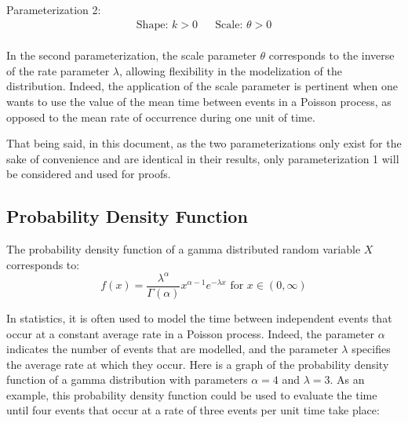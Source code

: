 \documentclass[12pt]{article}
\begin{document}
\noindent Parameterization 2:\vspace*{-24pt}
\begin{align*}
	\text{Shape: } k>0			&&	\text{Scale: }\theta>0
\end{align*}\\[-60pt]

In the second parameterization, the scale parameter $\theta$ corresponds to the inverse of the rate parameter $\lambda$,
allowing flexibility in the modelization of the distribution. Indeed, the application of the scale parameter is
pertinent when one wants to use the value of the mean time between events in a Poisson process, as
opposed to the mean rate of occurrence during one unit of time.

That being said, in this document, as the two parameterizations only exist for the sake of convenience and are identical
in their results, only parameterization 1 will be considered and used for proofs.


\pagebreak
\subsection{Probability Density Function}\label{subsec:gamma:pdf}
The probability density function of a gamma distributed random variable $X$ corresponds to:
\begin{equation}\label{eq:gamma:pdf}
	f(x) = \frac{\lambda^\alpha}{\Gamma(\alpha)}x^{\alpha-1}e^{-\lambda x}\text{ for }x\in (0, \infty)
\end{equation}

In statistics, it is often used to model the time between independent events that occur at a constant average rate in a
Poisson process. Indeed, the parameter $\alpha$ indicates the number of events that are modelled, and the parameter
$\lambda$ specifies the average rate at which they occur. Here is a graph of the probability density function of a gamma
distribution with parameters $\alpha=4$ and $\lambda=3$. As an example, this probability density function could be used
to evaluate the time until four events that occur at a rate of three events per unit time take place:
\end{document}

